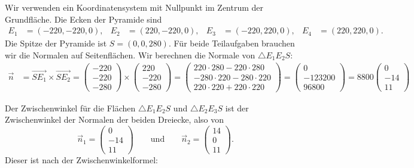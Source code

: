 \begin{loesung}
Wir verwenden ein Koordinatensystem mit Nullpunkt im Zentrum der
Grundfläche. Die Ecken der Pyramide sind
\begin{align*}
E_1&=(-220,-220, 0),&
E_2&=( 220,-220, 0),&
E_3&=(-220, 220, 0),&
E_4&=( 220, 220, 0).
\end{align*}
Die Spitze der Pyramide ist $S=(0,0,280)$.
Für beide Teilaufgaben brauchen wir die Normalen auf Seitenflächen.
Wir berechnen die Normale von $\triangle E_1E_2S$:
\begin{align*}
\vec n
&=
\overrightarrow{SE_1}\times \overrightarrow{SE_2}
=
\begin{pmatrix}-220\\-220\\-280\end{pmatrix}
\times
\begin{pmatrix} 220\\-220\\-280\end{pmatrix}
=
\begin{pmatrix}
220\cdot 280-220\cdot280\\
-280\cdot220-280\cdot220\\
220\cdot220+220\cdot 220
\end{pmatrix}
=
\begin{pmatrix} 0\\ -123200\\ 96800 \end{pmatrix}
=
8800
\begin{pmatrix} 0\\ -14\\ 11 \end{pmatrix}
\end{align*}
\begin{teilaufgaben}
\item
Der Zwischenwinkel für die Flächen $\triangle E_1E_2S$ und
$\triangle E_2E_3S$ ist der Zwischenwinkel der Normalen der beiden
Dreiecke, also von
\[
\vec n_1
=
\begin{pmatrix} 0\\-14\\11 \end{pmatrix}
\qquad\text{und}\qquad
\vec n_2
=
\begin{pmatrix} 14\\0\\11 \end{pmatrix}.
\]
Dieser ist nach der Zwischenwinkelformel:
\begin{align*}

\end{align*}
\end{teilaufgaben}
\end{loesung}
